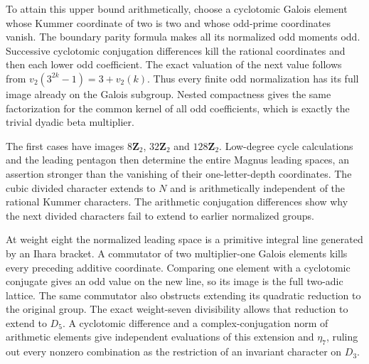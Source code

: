 \documentclass[11pt,a4paper]{article}
\theoremstyle{definition}
\theoremstyle{remark}
\begin{document}
To attain this upper bound arithmetically, choose a cyclotomic Galois
element whose Kummer coordinate of two is two and whose odd-prime
coordinates vanish. The boundary parity formula makes all its normalized
odd moments odd. Successive cyclotomic conjugation differences kill
the rational coordinates and then each lower odd coefficient. The exact
valuation of the next value follows from
$v_2(3^{2k}-1)=3+v_2(k)$. Thus every finite odd normalization has its
full image already on the Galois subgroup. Nested compactness gives the
same factorization for the common kernel of all odd coefficients,
which is exactly the trivial dyadic beta multiplier.

The first cases have images $8\mathbf Z_2$, $32\mathbf Z_2$ and
$128\mathbf Z_2$. Low-degree cycle calculations and the leading
pentagon then determine the entire Magnus leading spaces, an assertion
stronger than the vanishing of their one-letter-depth coordinates.
The cubic divided character extends to $N$ and is arithmetically
independent of the rational Kummer characters. The arithmetic
conjugation differences show why the next divided characters fail to
extend to earlier normalized groups.

At weight eight the normalized leading space is a primitive integral
line generated by an Ihara bracket. A commutator of two multiplier-one
Galois elements kills every preceding additive coordinate. Comparing
one element with a cyclotomic conjugate gives an odd value on the new
line, so its image is the full two-adic lattice. The same commutator
also obstructs extending its quadratic reduction to the original group.
The exact weight-seven divisibility allows that reduction to extend to
$D_5$. A cyclotomic difference and a complex-conjugation norm of arithmetic
elements give independent evaluations of this extension and $\eta_7$,
ruling out every nonzero combination as the restriction of an invariant
character on $D_3$.
\end{document}

